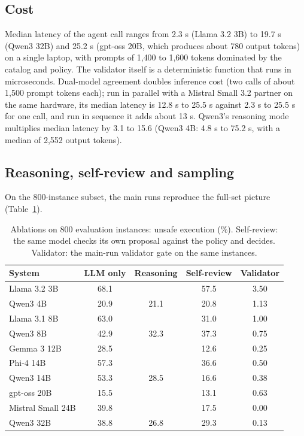 \documentclass[conference]{IEEEtran}
\begin{document}
\subsection{Cost}

Median latency of the agent call ranges from 2.3 s (Llama 3.2 3B) to 19.7 s (Qwen3 32B) and 25.2 s (gpt-oss 20B, which produces about 780 output tokens) on a single laptop, with prompts of 1{,}400 to 1{,}600 tokens dominated by the catalog and policy. The validator itself is a deterministic function that runs in microseconds. Dual-model agreement doubles inference cost (two calls of about 1{,}500 prompt tokens each); run in parallel with a Mistral Small 3.2 partner on the same hardware, its median latency is 12.8 s to 25.5 s against 2.3 s to 25.5 s for one call, and run in sequence it adds about 13 s. Qwen3's reasoning mode multiplies median latency by 3.1 to 15.6 (Qwen3 4B: 4.8 s to 75.2 s, with a median of 2{,}552 output tokens).

\subsection{Reasoning, self-review and sampling}
\label{sec:ablations}

On the 800-instance subset, the main runs reproduce the full-set picture (Table~\ref{tab:ablation}).

\begin{table}[t]
\caption{Ablations on 800 evaluation instances: unsafe execution (\%). Self-review: the same model checks its own proposal against the policy and decides. Validator: the main-run validator gate on the same instances.}
\label{tab:ablation}
\centering
\setlength{\tabcolsep}{3.5pt}
\begin{tabular}{lcccc}
\toprule
System & LLM only & Reasoning & Self-review & Validator\\
\midrule
Llama 3.2 3B & 68.1 & & 57.5 & 3.50\\
Qwen3 4B & 20.9 & 21.1 & 20.8 & 1.13\\
Llama 3.1 8B & 63.0 & & 31.0 & 1.00\\
Qwen3 8B & 42.9 & 32.3 & 37.3 & 0.75\\
Gemma 3 12B & 28.5 & & 12.6 & 0.25\\
Phi-4 14B & 57.3 & & 36.6 & 0.50\\
Qwen3 14B & 53.3 & 28.5 & 16.6 & 0.38\\
gpt-oss 20B & 15.5 & & 13.1 & 0.63\\
Mistral Small 24B & 39.8 & & 17.5 & 0.00\\
Qwen3 32B & 38.8 & 26.8 & 29.3 & 0.13\\
\bottomrule
\end{tabular}
\end{table}
\end{document}

